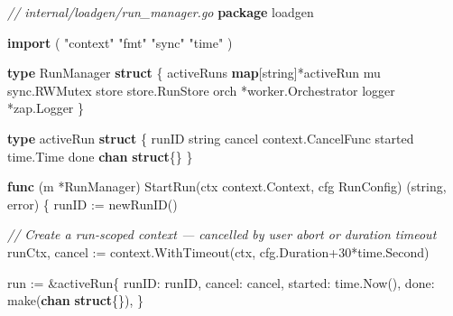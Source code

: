 \documentclass[
]{article}
\newenvironment{Shaded}{}{}
\newcommand{\BuiltInTok}[1]{\textcolor[rgb]{0.00,0.50,0.00}{#1}}
\newcommand{\CommentTok}[1]{\textcolor[rgb]{0.38,0.63,0.69}{\textit{#1}}}
\newcommand{\DataTypeTok}[1]{\textcolor[rgb]{0.56,0.13,0.00}{#1}}
\newcommand{\DecValTok}[1]{\textcolor[rgb]{0.25,0.63,0.44}{#1}}
\newcommand{\KeywordTok}[1]{\textcolor[rgb]{0.00,0.44,0.13}{\textbf{#1}}}
\newcommand{\NormalTok}[1]{#1}
\newcommand{\OperatorTok}[1]{\textcolor[rgb]{0.40,0.40,0.40}{#1}}
\newcommand{\StringTok}[1]{\textcolor[rgb]{0.25,0.44,0.63}{#1}}
\begin{document}
\begin{Shaded}
\begin{Highlighting}[]
\CommentTok{// internal/loadgen/run\_manager.go}
\KeywordTok{package}\NormalTok{ loadgen}

\KeywordTok{import} \OperatorTok{(}
    \StringTok{"context"}
    \StringTok{"fmt"}
    \StringTok{"sync"}
    \StringTok{"time"}
\OperatorTok{)}

\KeywordTok{type}\NormalTok{ RunManager }\KeywordTok{struct} \OperatorTok{\{}
\NormalTok{    activeRuns  }\KeywordTok{map}\OperatorTok{[}\DataTypeTok{string}\OperatorTok{]*}\NormalTok{activeRun}
\NormalTok{    mu          sync}\OperatorTok{.}\NormalTok{RWMutex}
\NormalTok{    store       store}\OperatorTok{.}\NormalTok{RunStore}
\NormalTok{    orch        }\OperatorTok{*}\NormalTok{worker}\OperatorTok{.}\NormalTok{Orchestrator}
\NormalTok{    logger      }\OperatorTok{*}\NormalTok{zap}\OperatorTok{.}\NormalTok{Logger}
\OperatorTok{\}}

\KeywordTok{type}\NormalTok{ activeRun }\KeywordTok{struct} \OperatorTok{\{}
\NormalTok{    runID   }\DataTypeTok{string}
\NormalTok{    cancel  context}\OperatorTok{.}\NormalTok{CancelFunc}
\NormalTok{    started time}\OperatorTok{.}\NormalTok{Time}
\NormalTok{    done    }\KeywordTok{chan} \KeywordTok{struct}\OperatorTok{\{\}}
\OperatorTok{\}}

\KeywordTok{func} \OperatorTok{(}\NormalTok{m }\OperatorTok{*}\NormalTok{RunManager}\OperatorTok{)}\NormalTok{ StartRun}\OperatorTok{(}\NormalTok{ctx context}\OperatorTok{.}\NormalTok{Context}\OperatorTok{,}\NormalTok{ cfg RunConfig}\OperatorTok{)} \OperatorTok{(}\DataTypeTok{string}\OperatorTok{,} \DataTypeTok{error}\OperatorTok{)} \OperatorTok{\{}
\NormalTok{    runID }\OperatorTok{:=}\NormalTok{ newRunID}\OperatorTok{()}

    \CommentTok{// Create a run{-}scoped context — cancelled by user abort or duration timeout}
\NormalTok{    runCtx}\OperatorTok{,}\NormalTok{ cancel }\OperatorTok{:=}\NormalTok{ context}\OperatorTok{.}\NormalTok{WithTimeout}\OperatorTok{(}\NormalTok{ctx}\OperatorTok{,}\NormalTok{ cfg}\OperatorTok{.}\NormalTok{Duration}\OperatorTok{+}\DecValTok{30}\OperatorTok{*}\NormalTok{time}\OperatorTok{.}\NormalTok{Second}\OperatorTok{)}

\NormalTok{    run }\OperatorTok{:=} \OperatorTok{\&}\NormalTok{activeRun}\OperatorTok{\{}
\NormalTok{        runID}\OperatorTok{:}\NormalTok{   runID}\OperatorTok{,}
\NormalTok{        cancel}\OperatorTok{:}\NormalTok{  cancel}\OperatorTok{,}
\NormalTok{        started}\OperatorTok{:}\NormalTok{ time}\OperatorTok{.}\NormalTok{Now}\OperatorTok{(),}
\NormalTok{        done}\OperatorTok{:}    \BuiltInTok{make}\OperatorTok{(}\KeywordTok{chan} \KeywordTok{struct}\OperatorTok{\{\}),}
    \OperatorTok{\}}


\end{Highlighting}
\end{Shaded}
\end{document}
